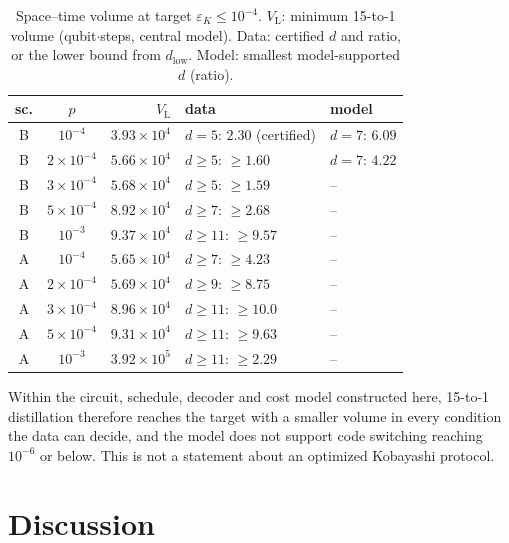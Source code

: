 \documentclass[a4paper]{article}
\newcommand{\epsK}{\varepsilon_K}
\begin{document}
\begin{table}[t]
\centering
\caption{Space--time volume at target $\epsK\le10^{-4}$. $V_{\mathrm{L}}$: minimum 15-to-1 volume (qubit$\cdot$steps, central model). Data: certified $d$ and ratio, or the lower bound from $d_{\mathrm{low}}$. Model: smallest model-supported $d$ (ratio).}
\label{tab:cost}
\small
\setlength{\tabcolsep}{3pt}
\begin{tabular}{ccrll}
\toprule
sc. & $p$ & $V_{\mathrm{L}}$ & data & model\\
\midrule
B & $10^{-4}$ & $3.93\times10^4$ & $d=5$: $2.30$ (certified) & $d=7$: $6.09$\\
B & $2\times10^{-4}$ & $5.66\times10^4$ & $d\ge5$: $\ge1.60$ & $d=7$: $4.22$\\
B & $3\times10^{-4}$ & $5.68\times10^4$ & $d\ge5$: $\ge1.59$ & --\\
B & $5\times10^{-4}$ & $8.92\times10^4$ & $d\ge7$: $\ge2.68$ & --\\
B & $10^{-3}$ & $9.37\times10^4$ & $d\ge11$: $\ge9.57$ & --\\
A & $10^{-4}$ & $5.65\times10^4$ & $d\ge7$: $\ge4.23$ & --\\
A & $2\times10^{-4}$ & $5.69\times10^4$ & $d\ge9$: $\ge8.75$ & --\\
A & $3\times10^{-4}$ & $8.96\times10^4$ & $d\ge11$: $\ge10.0$ & --\\
A & $5\times10^{-4}$ & $9.31\times10^4$ & $d\ge11$: $\ge9.63$ & --\\
A & $10^{-3}$ & $3.92\times10^5$ & $d\ge11$: $\ge2.29$ & --\\
\bottomrule
\end{tabular}
\end{table}

Within the circuit, schedule, decoder and cost model constructed here, 15-to-1 distillation therefore reaches the target with a smaller volume in every condition the data can decide, and the model does not support code switching reaching $10^{-6}$ or below. This is not a statement about an optimized Kobayashi protocol.

\section{Discussion}
\label{sec:discussion}
\end{document}
